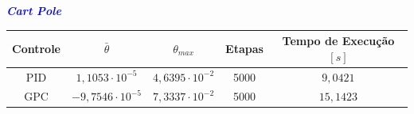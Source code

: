 \documentclass[aspectratio=169]{beamer}
\begin{document}
\begin{frame}{\textcolor{blue}{\textbf{\textit{Cart Pole}}}}
\begin{table}[H]
	\centering
	\vspace*{-.2cm}
	\begin{tabular}{ccccc}
            \rowcolor{blue!30} Controle & $\bar{\theta}$ & $\theta_{max}$ & Etapas & Tempo de Execução $[s]$\\
            \hline
            PID & $1,1053\cdot 10^{-5}$ & $4,6395\cdot 10^{-2}$ & 5000 & $9,0421$\\
            GPC & $-9,7546\cdot 10^{-5}$ & $7,3337\cdot 10^{-2}$  & 5000 & $15,1423$\\ 
            \hline
	\end{tabular}  
    \label{tab:intcartpole}                 %
\end{table}

\end{frame}

\end{document}

